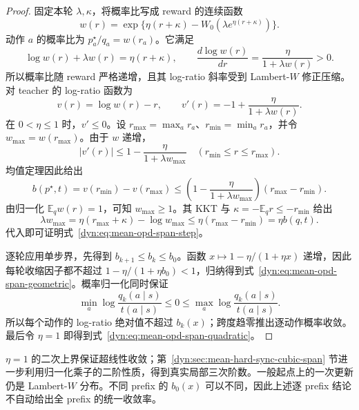 \documentclass[lang=cn,scheme=chinese,openany]{../book/elegantbook}
\newcommand{\E}{\mathbb E}
\begin{document}
\begin{proof}
固定本轮 $\lambda,\kappa$，将概率比写成 reward 的连续函数
\begin{equation*}
 w(r)=\exp\{\eta(r+\kappa)-W_0(\lambda e^{\eta(r+\kappa)})\}.
\end{equation*}
动作 $a$ 的概率比为 $p_a^\star/q_a=w(r_a)$。它满足
\begin{equation*}
 \log w(r)+\lambda w(r)=\eta(r+\kappa),
 \qquad
 \frac{d\log w(r)}{dr}=\frac{\eta}{1+\lambda w(r)}>0.
\end{equation*}
所以概率比随 reward 严格递增，且其 log-ratio 斜率受到 Lambert-$W$ 修正压缩。对 teacher 的 log-ratio 函数为
\begin{equation*}
 v(r)=\log w(r)-r,
 \qquad v'(r)=-1+\frac{\eta}{1+\lambda w(r)}.
\end{equation*}
在 $0<\eta\le1$ 时，$v'\le0$。设 $r_{\max}=\max_a r_a$、$r_{\min}=\min_a r_a$，并令 $w_{\max}=w(r_{\max})$。由于 $w$ 递增，
\begin{equation*}
 |v'(r)|\le1-\frac{\eta}{1+\lambda w_{\max}}
 \quad (r_{\min}\le r\le r_{\max}).
\end{equation*}
均值定理因此给出
\begin{equation*}
 b(p^\star,t)=v(r_{\min})-v(r_{\max})
 \le\left(1-\frac{\eta}{1+\lambda w_{\max}}\right)
       (r_{\max}-r_{\min}).
\end{equation*}
由归一化 $\E_qw(r)=1$，可知 $w_{\max}\ge1$。其 KKT 与 $\kappa=-\E_qr\le-r_{\min}$ 给出
\begin{equation*}
 \lambda w_{\max}
 =\eta(r_{\max}+\kappa)-\log w_{\max}
 \le\eta(r_{\max}-r_{\min})=\eta b(q,t).
\end{equation*}
代入即可证明式~\eqref{dyn:eq:mean-opd-span-step}。

逐轮应用单步界，先得到 $b_{k+1}\le b_k\le b_0$。函数 $x\mapsto1-\eta/(1+\eta x)$ 递增，因此每轮收缩因子都不超过 $1-\eta/(1+\eta b_0)<1$，归纳得到式~\eqref{dyn:eq:mean-opd-span-geometric}。概率归一化同时保证
\begin{equation*}
 \min_a\log\frac{q_k(a\mid s)}{t(a\mid s)}
 \le0\le
 \max_a\log\frac{q_k(a\mid s)}{t(a\mid s)}.
\end{equation*}
所以每个动作的 log-ratio 绝对值不超过 $b_k(x)$；跨度趋零推出逐动作概率收敛。最后令 $\eta=1$ 即得到式~\eqref{dyn:eq:mean-opd-span-quadratic}。
\end{proof}

$\eta=1$ 的二次上界保证超线性收敛；第~\ref{dyn:sec:mean-hard-sync-cubic-span} 节进一步利用归一化乘子的二阶性质，得到真实局部三次阶数。一般起点上的一次更新仍是 Lambert-$W$ 分布。不同 prefix 的 $b_0(x)$ 可以不同，因此上述逐 prefix 结论不自动给出全 prefix 的统一收敛率。
\end{document}
